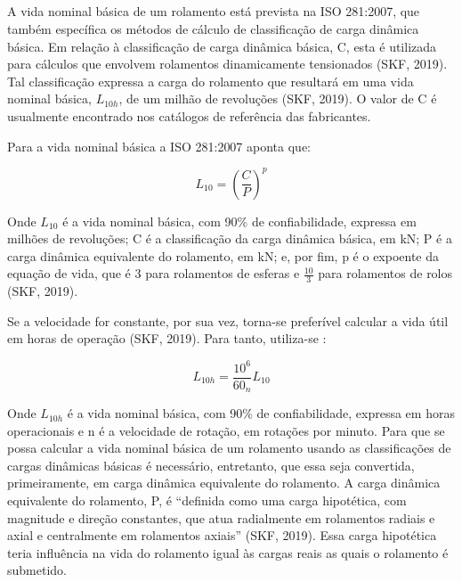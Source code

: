 \documentclass[
	12pt,				
	oneside,			
	a4paper,			
	english,			
	brazil,	
	sumario=abnt-6027-2012		
	]{abntex2ppgsi}
\begin{document}
\subsection{}

A vida nominal básica de um rolamento está prevista na ISO 281:2007, que também específica os métodos de cálculo de classificação de carga dinâmica básica. Em relação à classificação de carga dinâmica básica, C, esta é utilizada para cálculos que envolvem rolamentos dinamicamente tensionados (SKF, 2019). Tal classificação expressa a carga do rolamento que resultará em uma vida nominal básica, $L_{10h}$, de um milhão de revoluções (SKF, 2019). O valor de C é usualmente encontrado nos catálogos de referência das fabricantes.   

Para a vida nominal básica a ISO 281:2007 aponta que:

\begin{equation}
	L_{10}= \left ( \frac{C}{P} \right )^{p}
	\label{eq: Vida Nominal Básica}
\end{equation}

Onde $L_{10}$ é a vida nominal básica, com 90\% de confiabilidade, expressa em milhões de revoluções; C é a classificação da carga dinâmica básica, em kN; P é a carga dinâmica equivalente do rolamento, em kN; e, por fim, p é o expoente da equação de vida, que é 3 para rolamentos de esferas e $ \frac{10}{3}$ para rolamentos de rolos (SKF, 2019).

Se a velocidade for constante, por sua vez, torna-se preferível calcular a vida útil em horas de operação (SKF, 2019). Para tanto, utiliza-se :

\begin{equation}
	L_{10h}= \frac{10^{6}}{60_{n}}L_{10}
	\label{eq: Vida Útil em Horas}
\end{equation}

Onde $L_{10h}$ é a vida nominal básica, com 90\% de confiabilidade, expressa em horas operacionais e n é a velocidade de rotação, em rotações por minuto. 
Para que se possa calcular a vida nominal básica de um rolamento usando as classificações de cargas dinâmicas básicas é necessário, entretanto, que essa seja convertida, primeiramente, em carga dinâmica equivalente do rolamento. A carga dinâmica equivalente do rolamento, P, é “definida como uma carga hipotética, com magnitude e direção constantes, que atua radialmente em rolamentos radiais e axial e centralmente em rolamentos axiais” (SKF, 2019). Essa carga hipotética teria influência na vida do rolamento igual às cargas reais as quais o rolamento é submetido.
\end{document}
